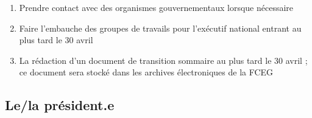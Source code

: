 \begin{enumerate}
\begin{enumerate}
    \begin{enumerate}
     \item
      veillant à ce que toutes les communications officielles soient bilingues et non-genrées
     \item
      veillant à ce que la mise à jour sur les tâches effectuées par tous les officiers, commissaires et directeur.trice.s soit dressée, puis distribuée aux membres au moins tous les deux mois
     \item
      veillant à ce qu'un rapport sur les résultats soit rédigé pour chacune des réunions où chacun des événements extérieurs auxquels un officier, un commissaire ou un.e directeur.trice a pu assister
    \end{enumerate}
   \item
    Prendre contact avec des organismes gouvernementaux lorsque nécessaire
   \item
    Faire l'embauche des groupes de travails pour l'exécutif national entrant au plus tard le 30 avril
   \item
    La rédaction d'un document de transition sommaire au plus tard le 30 avril ; ce document sera stocké dans les archives électroniques de la FCEG
  \end{enumerate}
\end{enumerate}

\subsection{Le/la président.e}
\label{le-la-president-e}

